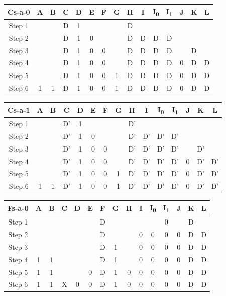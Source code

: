 \documentclass[11pt]{report}
\begin{document}
\begin{tabular}{ |c||c|c|c|c|c|c|c|c|c|c|c|c|c|c| }
\hline
\bf Cs-a-0 & \bf A & \bf B & \bf C & \bf D & \bf E & \bf F & G & H & I & I\textsubscript{0} & I\textsubscript{1} & J & K & \bf L \\
\hline
\hline
Step 1 & & & D & 1 & & & & D & & & & & & \\
\hline
Step 2 & & & D & 1 & 0 & & & D & D & D & D & & & \\
\hline
Step 3 & & & D & 1 & 0 & 0 & & D & D & D & D & & D & \\
\hline
Step 4 & & & D & 1 & 0 & 0 & & D & D & D & D & 0 & D & D \\
\hline
Step 5 & & & D & 1 & 0 & 0 & 1 & D & D & D & D & 0 & D & D \\
\hline
Step 6 & 1 & 1 & D & 1 & 0 & 0 & 1 & D & D & D & D & 0 & D & D \\
\hline
\end{tabular}




\begin{tabular}{ |c||c|c|c|c|c|c|c|c|c|c|c|c|c|c| }
\hline
\bf Cs-a-1 & \bf A & \bf B & \bf C & \bf D & \bf E & \bf F & G & H & I & I\textsubscript{0} & I\textsubscript{1} & J & K & \bf L \\
\hline
\hline
Step 1 & & & D' & 1 & & & & D' & & & & & & \\
\hline
Step 2 & & & D' & 1 & 0 & & & D' & D' & D' & D' & & & \\
\hline
Step 3 & & & D' & 1 & 0 & 0 & & D' & D' & D' & D' & & D' & \\
\hline
Step 4 & & & D' & 1 & 0 & 0 & & D' & D' & D' & D' & 0 & D' & D' \\
\hline
Step 5 & & & D' & 1 & 0 & 0 & 1 & D' & D' & D' & D' & 0 & D' & D' \\
\hline
Step 6 & 1 & 1 & D' & 1 & 0 & 0 & 1 & D' & D' & D' & D' & 0 & D' & D' \\
\hline
\end{tabular}



\begin{tabular}{ |c||c|c|c|c|c|c|c|c|c|c|c|c|c|c| }
\hline
\bf Fs-a-0 & \bf A & \bf B & \bf C & \bf D & \bf E & \bf F & G & H & I & I\textsubscript{0} & I\textsubscript{1} & J & K & \bf L \\
\hline
\hline
Step 1 & & & & & & D & & & & & 0 & & D & \\
\hline
Step 2 & & & & & & D & & & 0 & 0 & 0 & 0 & D & D \\
\hline
Step 3 & & & & & & D & 1 & & 0 & 0 & 0 & 0 & D & D \\
\hline
Step 4 & 1 & 1 & & & & D & 1 & & 0 & 0 & 0 & 0 & D & D \\
\hline
Step 5 & 1 & 1 & & & 0 & D & 1 & 0 & 0 & 0 & 0 & 0 & D & D \\
\hline
Step 6 & 1 & 1 & X & 0 & 0 & D & 1 & 0 & 0 & 0 & 0 & 0 & D & D \\
\hline
\end{tabular}
\end{document}
